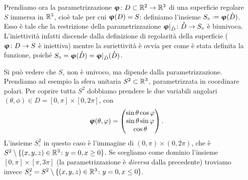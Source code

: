 Prendiamo ora la parametrizzazione $\bm{\upvarphi}\colon D\subset\mathbb{R}^2\to\mathbb{R}^3$ di una superficie regolare $S$ immersa in $\mathbb{R}^3$, cioè tale per cui $\bm{\upvarphi}(D)=S$: definiamo l'insieme $S_\circ\defeq\vphi(\interior{D})$.
Esso è tale che la restrizione della parametrizzazione $\bm{\upvarphi}|_{\mathring{D}}\colon\mathring{D}\to S_\circ$ è biunivoca.
L'iniettività infatti discende dalla definizione di regolarità della superficie ($\bm{\upvarphi}\colon D\to S$ è iniettiva) mentre la suriettività è ovvia per come è stata definita la funzione, poich\'e $S_\circ=\bm{\upvarphi}(\mathring{D})=\bm{\upvarphi}|_{\mathring{D}}(\mathring{D})$.

Si può vedere che $S_\circ$ non è univoco, ma dipende dalla parametrizzazione.
Prendiamo ad esempio la sfera unitaria $S^2\subset\mathbb{R}^3$, parametrizzata in coordinare polari.
Per coprire tutta $S^2$ dobbiamo prendere le due variabili angolari $(\theta,\phi)\in D=[0,\pi]\times[0,2\pi]$, con
\begin{equation}
	\bm{\upvarphi}(\theta,\varphi)=
	\begin{pmatrix}
		\sin\theta\cos\varphi\\
		\sin\theta\sin\varphi\\
		\cos\theta
	\end{pmatrix}.
\end{equation}
L'insieme $S^2_\circ$ in questo caso è l'immagine di $(0,\pi)\times(0,2\pi)$, che è $S^2\setminus\{(x,y,z)\in\mathbb{R}^3\colon y=0,x\ge 0\}$.
Se scegliamo come dominio l'insieme $[0,\pi]\times[\pi,3\pi]$ (la parametrizzazione è \emph{diversa} dalla precedente) troviamo invece $S^2_\circ=S^2\setminus\{(x,y,z)\in\mathbb{R}^3\colon y=0,x\le 0\}$.

